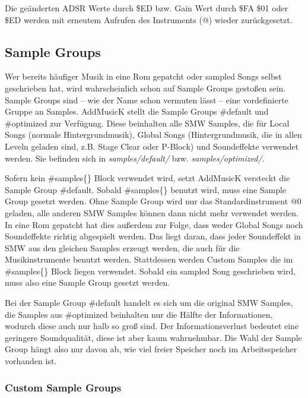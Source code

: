 \bigskip

Die geänderten ADSR Werte durch \$ED bzw. Gain Wert durch \$FA \$01 oder \$ED werden mit erneutem Aufrufen des Instruments (@) wieder zurückgesetzt.

\subsection{Sample Groups}

Wer bereits häufiger Musik in eine Rom gepatcht oder sampled Songs selbst geschrieben hat, wird wahrscheinlich schon auf Sample Groups gestoßen sein. \\
Sample Groups sind -- wie der Name schon vermuten lässt -- eine vordefinierte Gruppe an Samples. AddMusicK stellt die Sample Groups \#default und \#optimized zur Verfügung. Diese beinhalten alle SMW Samples, die für Local Songs (normale Hintergrundmusik), Global Songs (Hintergrundmusik, die in allen Leveln geladen sind, z.B. Stage Clear oder P-Block) und Soundeffekte verwendet werden.
Sie befinden sich in \textit{samples/default/} bzw. \textit{samples/optimized/}.

\bigskip

Sofern kein \#samples\{\} Block verwendet wird, setzt AddMusicK versteckt die Sample Group \#default. Sobald \#samples\{\} benutzt wird, muss eine Sample Group gesetzt werden.
Ohne Sample Group wird nur das Standardinstrument @0 geladen, alle anderen SMW Samples können dann nicht mehr verwendet werden. \\
In eine Rom gepatcht hat dies außerdem zur Folge, dass weder Global Songs noch Soundeffekte richtig abgespielt werden. Das liegt daran, dass jeder Soundeffekt in SMW aus den gleichen Samples erzeugt werden, die auch für die Musikinstrumente benutzt werden.
Stattdessen werden Custom Samples die im \#samples\{\} Block liegen verwendet. Sobald ein sampled Song geschrieben wird, muss also eine Sample Group gesetzt werden.

\bigskip

Bei der Sample Group \#default handelt es sich um die original SMW Samples, die Samples aus \#optimized beinhalten nur die Hälfte der Informationen, wodurch diese auch nur halb so groß sind.
Der Informationsverlust bedeutet eine geringere Soundqualität, diese ist aber kaum wahrnehmbar. Die Wahl der Sample Group hängt also nur davon ab, wie viel freier Speicher noch im Arbeitsspeicher vorhanden ist.

\subsubsection*{Custom Sample Groups}

